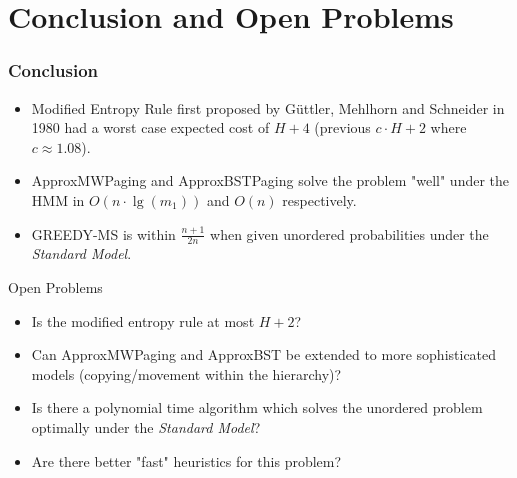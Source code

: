 \documentclass{beamer}
\theoremstyle{plain}
\begin{document}



\section{Conclusion and Open Problems} \label{Conclusion and Open Problems}

\begin{frame} \frametitle{Conclusion}
\begin{itemize}
\item Modified Entropy Rule first proposed by  G{\"u}ttler, Mehlhorn and Schneider in 1980 had a worst case expected cost of $H+4$ (previous $c\cdot H+2$ where $c \approx 1.08$).

\item ApproxMWPaging and ApproxBSTPaging solve the problem "well" under the HMM in $O(n\cdot \lg(m_1))$ and $O(n)$ respectively.

\item GREEDY-MS is within $\frac{n+1}{2n}$ when given unordered probabilities under the \textit{Standard Model}.   
\end{itemize}

\end{frame}


\begin{frame}{Open Problems}
\begin{itemize}
\item Is the modified entropy rule at most $H+2$?
\item Can ApproxMWPaging and ApproxBST be extended to more sophisticated models (copying/movement within the hierarchy)?
\item Is there a polynomial time algorithm which solves the unordered problem optimally under the \textit{Standard Model}?
\item Are there better "fast" heuristics for this problem?
\end{itemize}
\end{frame}




\end{document}

